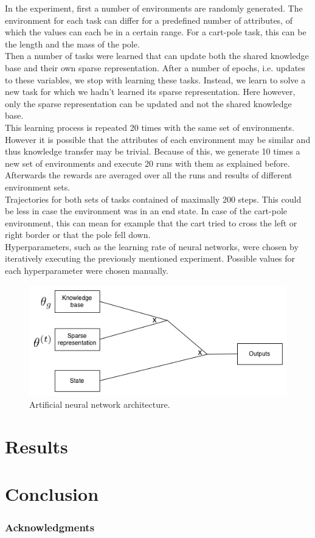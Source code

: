 \documentclass[a4paper]{article}
\begin{document}
In the experiment, first a number of environments are randomly generated. The environment for each task can differ for a predefined number of attributes, of which the values can each be in a certain range. For a cart-pole task, this can be the length and the mass of the pole.\\
Then a number of tasks were learned that can update both the shared knowledge base and their own sparse representation. After a number of epochs, i.e. updates to these variables, we stop with learning these tasks. Instead, we learn to solve a new task for which we hadn't learned its sparse representation. Here however, only the sparse representation can be updated and not the shared knowledge base.\\
This learning process is repeated 20 times with the same set of environments. However it is possible that the attributes of each environment may be similar and thus knowledge transfer may be trivial. Because of this, we generate 10 times a new set of environments and execute 20 runs with them as explained before.\\
Afterwards the rewards are averaged over all the runs and results of different environment sets.\\
Trajectories for both sets of tasks contained of maximally 200 steps. This could be less in case the environment was in an end state. In case of the cart-pole environment, this can mean for example that the cart tried to cross the left or right border or that the pole fell down.\\
Hyperparameters, such as the learning rate of neural networks, were chosen by iteratively executing the previously mentioned experiment. Possible values for each hyperparameter were chosen manually.

\begin{figure}[H]
    \centering
    \includegraphics[width=\linewidth]{images/knowledge_transfer.png}
    \caption{Artificial neural network architecture.}
    \label{fig:algonn}
\end{figure}
\section{Results}
\section{Conclusion}
\subsubsection*{Acknowledgments}



\end{document}
